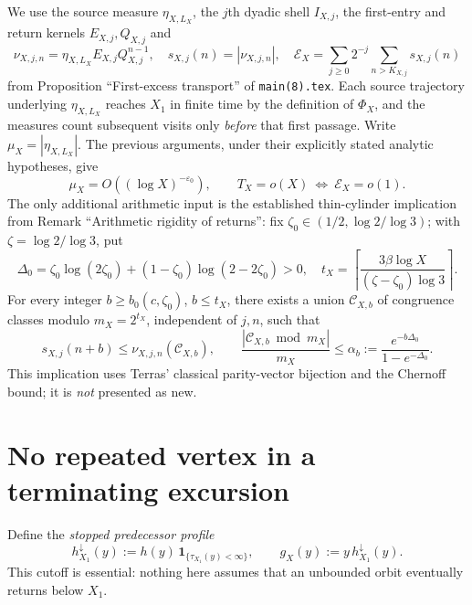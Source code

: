 \documentclass[11pt,a4paper]{article}
\newcommand{\EX}{\mathcal E_X}
\newcommand{\1}{\mathbf 1}
\begin{document}
We use the source measure $\eta_{X,L_X}$, the $j$th dyadic shell $I_{X,j}$, the first-entry and return kernels $E_{X,j},Q_{X,j}$ and
\[
 \nu_{X,j,n}=\eta_{X,L_X}E_{X,j}Q_{X,j}^{n-1},\quad s_{X,j}(n)=|\nu_{X,j,n}|,\quad
 \EX=\sum_{j\ge0}2^{-j}\sum_{n>K_{X,j}}s_{X,j}(n)
\]
from Proposition ``First-excess transport'' of \texttt{main(8).tex}. Each source trajectory underlying $\eta_{X,L_X}$ reaches $X_1$ in finite time by the definition of $\Phi_X$, and the measures count subsequent visits only \emph{before} that first passage. Write $\mu_X=|\eta_{X,L_X}|$. The previous arguments, under their explicitly stated analytic hypotheses, give
\begin{equation}\label{eq:inputs}
 \mu_X=O((\log X)^{-\varepsilon_0}),\qquad
 T_X=o(X)\ \Longleftrightarrow\ \EX=o(1).
\end{equation}
The only additional arithmetic input is the established thin-cylinder implication from Remark ``Arithmetic rigidity of returns'': fix $\zeta_0\in(1/2,\log2/\log3)$; with $\zeta=\log2/\log3$, put
\[
 \Delta_0=\zeta_0\log(2\zeta_0)+(1-\zeta_0)\log(2-2\zeta_0)>0,\quad
 t_X=\left\lceil\frac{3\beta\log X}{(\zeta-\zeta_0)\log3}\right\rceil.
\]
For every integer $b\ge b_0(c,\zeta_0)$, $b\le t_X$, there exists a union $\mathcal C_{X,b}$ of congruence classes modulo $m_X=2^{t_X}$, independent of $j,n$, such that
\begin{equation}\label{eq:thin}
 s_{X,j}(n+b)\le\nu_{X,j,n}(\mathcal C_{X,b}),\qquad
 \frac{|\mathcal C_{X,b}\bmod m_X|}{m_X}\le\alpha_b:=\frac{e^{-b\Delta_0}}{1-e^{-\Delta_0}}.
\end{equation}
This implication uses Terras' classical parity-vector bijection and the Chernoff bound; it is \emph{not} presented as new.

\section{No repeated vertex in a terminating excursion}
Define the \emph{stopped predecessor profile}
\[
 h^{\downarrow}_{X_1}(y):=h(y)\,\1_{\{\tau_{X_1}(y)<\infty\}},\qquad
 g_X(y):=y\,h^{\downarrow}_{X_1}(y).
\]
This cutoff is essential: nothing here assumes that an unbounded orbit eventually returns below $X_1$.
\end{document}
